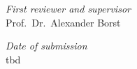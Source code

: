 \hfill

\vfill

\textit{First reviewer and supervisor} \\
Prof.\ Dr.\ Alexander Borst

\bigskip



\textit{Date of submission} \\
tbd


